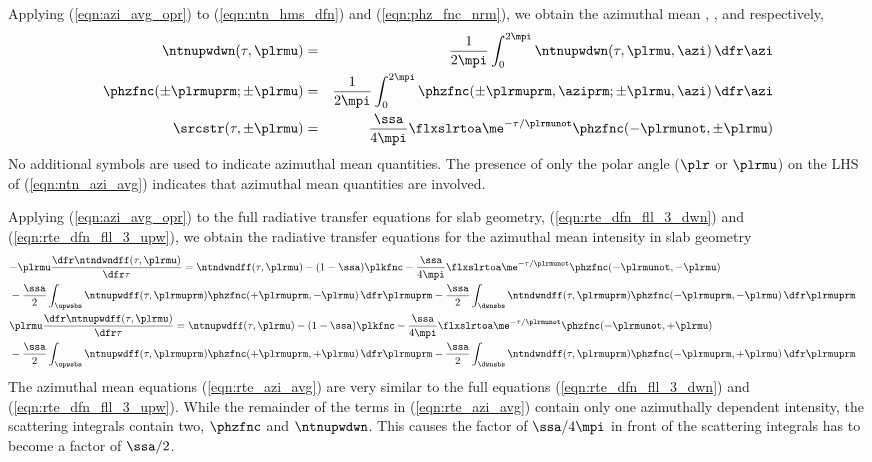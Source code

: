 \documentclass[12pt]{article}
\begin{document}
Applying (\ref{eqn:azi_avg_opr}) to (\ref{eqn:ntn_hms_dfn}) and
(\ref{eqn:phz_fnc_nrm}), we obtain the azimuthal mean
, , and
 respectively, 
\begin{eqnarray}
\label{eqn:ntn_azi_avg}
\ntnupwdwn(\tau,\plrmu) & = & \frac{1}{2\mpi} \int_{0}^{2\mpi} 
\ntnupwdwn(\tau,\plrmu,\azi) \,\dfr\azi \\
\label{eqn:phz_fnc_azi_avg}
\phzfnc(\pm\plrmuprm;\pm\plrmu) & = & \frac{1}{2\mpi} \int_{0}^{2\mpi}
\phzfnc(\pm\plrmuprm,\aziprm;\pm\plrmu,\azi) \,\dfr\azi \\
\label{eqn:src_str_azi_avg}
\srcstr(\tau,\pm\plrmu) & = &
\frac{\ssa}{4\mpi} \flxslrtoa \me^{-\tau/\plrmunot}
\phzfnc(-\plrmunot,\pm\plrmu)
\end{eqnarray}
No additional symbols are used to indicate azimuthal mean quantities.
The presence of only the polar angle ($\plr$ or $\plrmu$) on the LHS 
of (\ref{eqn:ntn_azi_avg}) indicates that azimuthal mean quantities
are involved. 

Applying (\ref{eqn:azi_avg_opr}) to the full radiative transfer
equations for slab geometry, 
(\ref{eqn:rte_dfn_fll_3_dwn}) and (\ref{eqn:rte_dfn_fll_3_upw}), 
we obtain the radiative transfer equations for the azimuthal mean
intensity in slab geometry
\begin{subequations}
\label{eqn:rte_azi_avg}
\begin{align}
\label{eqn:rte_azi_avg_dwn}
\lefteqn{ - \plrmu \frac{\dfr\ntndwndff(\tau,\plrmu)}{\dfr\tau} = 
\ntndwndff(\tau,\plrmu) - (1-\ssa) \plkfnc - 
\frac{\ssa}{4\mpi} \flxslrtoa \me^{-\tau/\plrmunot}
\phzfnc(-\plrmunot,-\plrmu) }
\nonumber \\ & {} %
- \frac{\ssa}{2} \int_{\upwsbs} \ntnupwdff(\tau,\plrmuprm) 
\phzfnc(+\plrmuprm,-\plrmu) \,\dfr\plrmuprm
- \frac{\ssa}{2} \int_{\dwnsbs} \ntndwndff(\tau,\plrmuprm) 
\phzfnc(-\plrmuprm,-\plrmu) \,\dfr\plrmuprm \\
\label{eqn:rte_azi_avg_upw}
\lefteqn{ \plrmu \frac{\dfr\ntnupwdff(\tau,\plrmu)}{\dfr\tau} =  
\ntnupwdff(\tau,\plrmu) - (1-\ssa) \plkfnc -
\frac{\ssa}{4\mpi} \flxslrtoa \me^{-\tau/\plrmunot}
\phzfnc(-\plrmunot,+\plrmu) }
\nonumber \\ & {} %
- \frac{\ssa}{2} \int_{\upwsbs} \ntnupwdff(\tau,\plrmuprm) 
\phzfnc(+\plrmuprm,+\plrmu) \,\dfr\plrmuprm
- \frac{\ssa}{2} \int_{\dwnsbs} \ntndwndff(\tau,\plrmuprm) 
\phzfnc(-\plrmuprm,+\plrmu) \,\dfr\plrmuprm
\end{align}
\end{subequations} 
The azimuthal mean equations (\ref{eqn:rte_azi_avg}) are very similar
to the full equations (\ref{eqn:rte_dfn_fll_3_dwn}) and
(\ref{eqn:rte_dfn_fll_3_upw}). 
While the remainder of the terms in (\ref{eqn:rte_azi_avg}) contain
only one azimuthally dependent intensity, the scattering integrals
contain two, $\phzfnc$ and $\ntnupwdwn$.
This causes the factor of $\ssa/4\mpi$ in front of the scattering
integrals has to become a factor of $\ssa/2$. 
\end{document}
